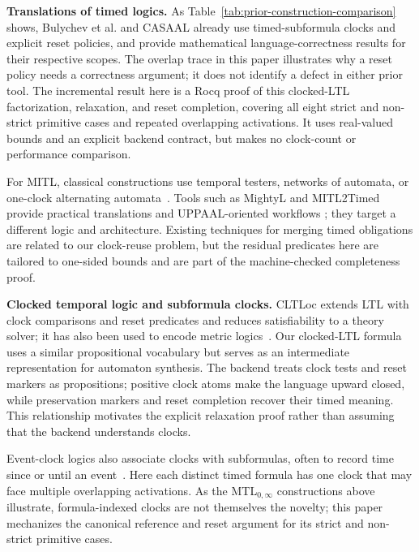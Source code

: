 \documentclass[10pt,journal,compsoc]{IEEEtran}
\newcommand{\runinhead}[1]{\par\smallskip\noindent\textbf{#1}\enspace}
\begin{document}
\runinhead{Translations of timed logics.}
As Table~\ref{tab:prior-construction-comparison} shows, Bulychev et al. and
CASAAL already use timed-subformula clocks and explicit reset policies, and
provide mathematical language-correctness results for their respective
scopes. The overlap trace in this paper illustrates why a reset policy needs a
correctness argument; it does not identify a defect in either prior tool. The
incremental result here is a Rocq proof of this clocked-LTL factorization,
relaxation, and reset completion, covering all eight strict and non-strict
primitive cases and repeated overlapping activations. It uses real-valued
bounds and an explicit backend contract, but makes no clock-count or
performance comparison.

For MITL, classical constructions use temporal testers, networks of
automata, or one-clock alternating automata~\cite{maler_mitl_to_ta,
ferrere2019_realtimelogic_to_ta,[BM14]}. Tools such as MightyL and MITL2Timed
provide practical translations and UPPAAL-oriented workflows
\cite{mightyl_paper17,mitl2timed_github}; they target a different logic and
architecture. Existing techniques for merging timed obligations are related
to our clock-reuse problem, but the residual predicates here are tailored to
one-sided bounds and are part of the machine-checked completeness proof.

\runinhead{Clocked temporal logic and subformula clocks.}
CLTLoc extends LTL with clock comparisons and reset predicates and reduces
satisfiability to a theory solver; it has also been used to encode metric
logics~\cite{bersani_cltloc}. Our clocked-LTL formula uses a similar
propositional vocabulary but serves as an intermediate representation for
automaton synthesis. The backend treats clock tests and reset markers as
propositions; positive clock atoms make the language upward closed, while
preservation markers and reset completion recover their timed meaning.
This relationship motivates the explicit relaxation proof rather than
assuming that the backend understands clocks.

Event-clock logics also associate clocks with subformulas, often to record time
since or until an event~\cite{afh_eventclock_tcs99,
raskin_schobbens_jalc99,nickovic_piterman_formats10}. Here each distinct timed
formula has one clock that may face multiple overlapping activations. As the
MTL$_{0,\infty}$ constructions above illustrate, formula-indexed clocks are
not themselves the novelty; this paper mechanizes the canonical reference and
reset argument for its strict and non-strict primitive cases.
\end{document}
